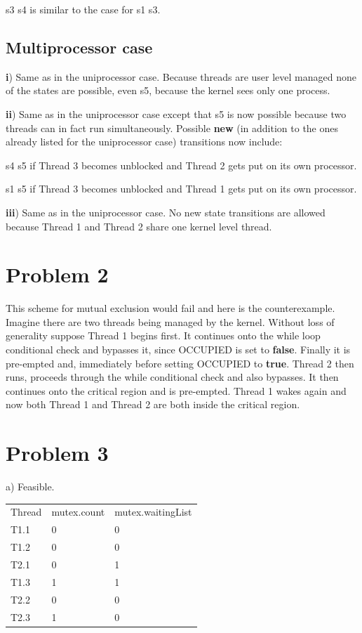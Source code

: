 \documentclass[11pt]{article} %
\begin{document}
\noindent s3  \overleftarrow{}\overrightarrow{} s4 is similar to the case for s1  \overleftarrow{}\overrightarrow{} s3.

\subsection*{Multiprocessor case}

\noindent \textbf{i}) Same as in the uniprocessor case. Because threads are user level managed none of the states are possible, even s5, because the kernel sees only one process.
\bigskip

\noindent \textbf{ii}) Same as in the uniprocessor case except that s5 is now possible because two threads can in fact run simultaneously. Possible \textbf{new} (in addition to the ones already listed for the uniprocessor case) transitions now include:

\bigskip
\noindent s4 \overrightarrow{} s5 if Thread 3 becomes unblocked and Thread 2 gets put on its own processor. 
\bigskip

\noindent s1 \overrightarrow{} s5 if Thread 3 becomes unblocked and Thread 1 gets put on its own processor.
\bigskip

\noindent \textbf{iii}) Same as in the uniprocessor case. No new state transitions are allowed because Thread 1 and Thread 2 share one kernel level thread.
\section*{Problem 2}
This scheme for mutual exclusion would fail and here is the counterexample. Imagine there are two threads being managed by the kernel. Without loss of generality suppose Thread 1 begins first. It continues onto the while loop conditional check and bypasses it, since OCCUPIED is set to \textbf{false}. Finally it is pre-empted and, immediately before setting OCCUPIED to \textbf{true}. Thread 2 then runs, proceeds through the while conditional check and also bypasses. It then continues onto the critical region and is pre-empted. Thread 1 wakes again and now both Thread 1 and Thread 2 are both inside the critical region.
\section*{Problem 3}

a) Feasible.
\bigskip

\begin{tabular}{ l l l }
  Thread & mutex.count & mutex.waitingList \\
  T1.1 & 0 & 0 \\
  T1.2 & 0 & 0 \\
  T2.1 & 0 & 1 \\
  T1.3 & 1 & 1 \\
  T2.2 & 0 & 0 \\
  T2.3 & 1 & 0 \\
\end{tabular}
\bigskip
\end{document}
